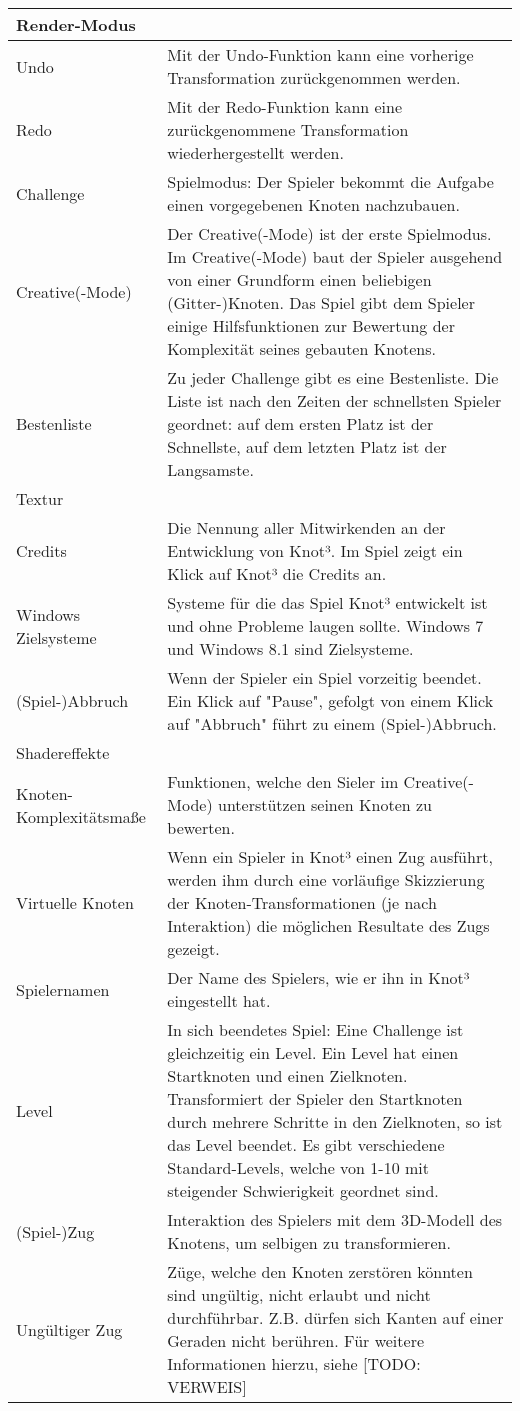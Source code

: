 \begin{longtable}{|p{}|p{}|}
\hline 
Render-Modus &  %
\\
\hline
Undo & Mit der Undo-Funktion kann eine vorherige Transformation zurückgenommen werden.
\\
\hline
Redo & Mit der Redo-Funktion kann eine zurückgenommene Transformation wiederhergestellt werden.
\\
\hline
Challenge & Spielmodus: Der Spieler bekommt die Aufgabe einen vorgegebenen Knoten nachzubauen.\\
\hline
Creative(-Mode) & Der Creative(-Mode) ist der erste Spielmodus. Im Creative(-Mode) baut der Spieler ausgehend von einer Grundform einen beliebigen (Gitter-)Knoten. Das Spiel gibt dem Spieler einige Hilfsfunktionen zur Bewertung der Komplexität seines gebauten Knotens.\\
\hline
Bestenliste & Zu jeder Challenge gibt es eine Bestenliste. 
Die Liste ist nach den Zeiten der schnellsten Spieler geordnet: auf dem ersten Platz ist der Schnellste, auf dem letzten Platz ist der Langsamste.
\\
\hline
Textur & \\ %
\hline
Credits & Die Nennung aller Mitwirkenden an der Entwicklung von Knot³. Im Spiel zeigt ein Klick auf Knot³ die Credits an.\\
\hline
Windows Zielsysteme & Systeme für die das Spiel Knot³ entwickelt ist und ohne Probleme laugen sollte. Windows 7 und Windows 8.1 sind Zielsysteme.\\
\hline
(Spiel-)Abbruch & Wenn der Spieler ein Spiel vorzeitig beendet. Ein Klick auf "Pause", gefolgt von einem Klick auf "Abbruch" führt zu einem (Spiel-)Abbruch.\\
\hline
Shadereffekte & \\
\hline
Knoten-Komplexitätsmaße & Funktionen, welche den Sieler im Creative(-Mode) unterstützen seinen Knoten zu bewerten.\\
\hline
Virtuelle Knoten & Wenn ein Spieler in Knot³ einen Zug ausführt, werden ihm durch eine vorläufige Skizzierung der Knoten-Transformationen (je nach Interaktion) die möglichen Resultate des Zugs gezeigt. \\
\hline
Spielernamen & Der Name des Spielers, wie er ihn in Knot³ eingestellt hat.\\
\hline
Level & In sich beendetes Spiel: Eine Challenge ist gleichzeitig ein Level. Ein Level hat einen Startknoten und einen Zielknoten. Transformiert der Spieler den Startknoten durch mehrere Schritte in den Zielknoten, so ist das Level beendet. Es gibt verschiedene Standard-Levels, welche von 1-10 mit steigender Schwierigkeit geordnet sind.\\
\hline
(Spiel-)Zug & Interaktion des Spielers mit dem 3D-Modell des Knotens, um selbigen zu transformieren.\\
\hline
Ungültiger Zug & Züge, welche den Knoten zerstören könnten sind ungültig, nicht erlaubt und nicht durchführbar. Z.B. dürfen sich Kanten auf einer Geraden nicht berühren. Für weitere Informationen hierzu, siehe {\color{red}[TODO: VERWEIS]}\\
\hline
\end{longtable}
